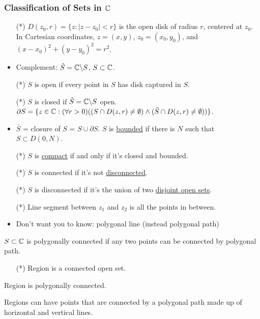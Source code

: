 \documentclass[]{article}
\begin{document}
\subsubsection{Classification of Sets in $\mathbb{C}$}
\begin{itemize}
	\item[(*)] $D(z_0,r) = \{z:|z-z_0|<r\}$ is the open disk of radius $r$, centered at $z_0$. In Cartesian coordinates, $z=(x,y)$, $z_0=(x_0,y_0)$, and $(x-x_0)^2+(y-y_0)^2=r^2$.
	\item Complement: $\tilde{S} = \mathbb{C} \backslash S$, $S\subset \mathbb{C}$.
	\item[(*)] $S$ is open if every point in $S$ has disk captured in $S$.
	\item[(*)] $S$ is closed if $\tilde{S}=\mathbb{C} \backslash S$ open.
	$\partial S = \{z\in\mathbb{C}: (\forall r>0)((S\cap D(z,r)\neq \emptyset)\land(\tilde{S}\cap D(z,r)\neq \emptyset))\}$.
	\item $\bar{S}$ = closure of $S$ = $S\cup \partial S$.
	$S$ is \underline{bounded} if there is $N$ such that $S\subset D(0,N)$.
	\item[(*)] $S$ is \underline{compact} if and only if it's closed and  bounded.
	\item[(*)] $S$ is connected if it's not \underline{disconnected}.
	\item[(*)] $S$ is disconnected if it's the union of two \underline{disjoint open sets}.
	\item[(*)] Line segment between $z_1$ and $z_2$ is all the points in between.
	\item Don't want you to know: polygonal line (instead polygonal path)
\end{itemize}

\begin{definition}
	$S\subset \mathbb{C}$ is polygonally connected if any two points can be connected by polygonal path.
\end{definition}
\begin{itemize}
	\item[(*)] Region is a connected open set.
\end{itemize}

\begin{proposition}
	Region is polygonally connected.
\end{proposition}

\begin{note}
	Regions can have points that are connected  by a polygonal path made up of horizontal and vertical lines.
\end{note}
\end{document}
